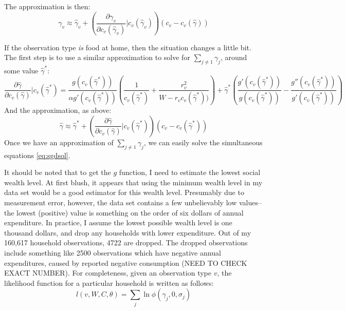 \documentclass{article}
\begin{document}
The approximation is then:
\begin{equation}
	\gamma_v \approx \hat{\gamma}_v + \left(\frac{\partial \gamma_v}{\partial c_v(\hat{\gamma}_v)}|c_v(\hat{\gamma}_v)\right) \left(c_v - c_v(\hat{\gamma})\right)
\end{equation}

If the observation type \emph{is} food at home, then the situation changes a little bit.  
The first step is to use a similar approximation to solve for $\sum_{j\neq 1} \gamma_j$, around some value $\hat{\gamma}^*$:
\begin{equation}
	\frac{\partial \hat{\gamma}}{\partial c_v(\hat{\gamma})}|c_v(\hat{\gamma}^*) = \frac{g(c_v(\hat{\gamma}^*))}{\alpha g'(c_v(\hat{\gamma}^*))}\left(\frac{1}{c_v(\hat{\gamma}^*)} + \frac{r_v^2}{W-r_v c_v(\hat{\gamma}^*))}\right) + \hat{\gamma}^* \left(\frac{g'(c_v(\hat{\gamma}^*))}{g(c_v(\hat{\gamma}^*))} - \frac{g''(c_v(\hat{\gamma}^*))}{g'(c_v(\hat{\gamma}^*))}\right)
\end{equation}
And the approximation, as above:
\begin{equation}
	\hat{\gamma} \approx \hat{\gamma}^* + \left(\frac{\partial \hat{\gamma}}{\partial c_v(\hat{\gamma})}|c_v(\hat{\gamma}^*)\right) \left(c_v - c_v(\hat{\gamma}^*)\right)
\end{equation}
Once we have an approximation of $\sum_{j\neq 1} \gamma_j$, we can easily solve the simultaneous equations \eqref{eq:sgdsol}.

It should be noted that to get the $g$ function, I need to estimate the lowest social wealth level. 
At first blush, it appears that using the minimum wealth level in my data set would be a good estimator for this wealth level.
Presumably due to measurement error, however, the data set contains a few unbelievably low values--the lowest (positive) value is something on the order of six dollars of annual expenditure.
In practice, I assume the lowest possible wealth level is one thousand dollars, and drop any households with lower expenditure.
Out of my 160,617 household observations, 4722 are dropped.
The dropped observations include something like 2500 observations which have negative annual expenditures, caused by reported negative consumption (NEED TO CHECK EXACT NUMBER).
For completeness, given an observation type $v$, the likelihood function for a particular household is written as follows:
\begin{equation}
	\label{lik1}
	l(v,W,C,\theta) = \sum_{j} \ln \phi(\gamma_j,0,\sigma_j)
\end{equation}
\end{document}
